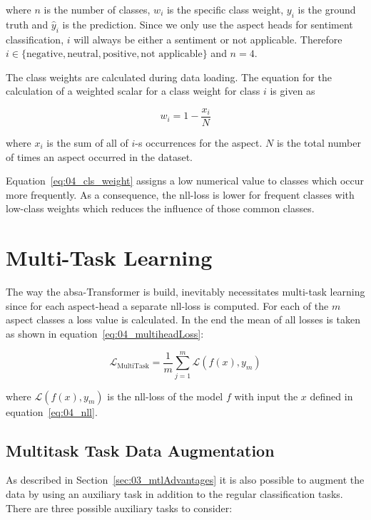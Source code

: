 where $n$ is the number of classes, $w_i$ is the specific class weight, $y_i$ is the ground truth and $\hat{y}_i$ is the prediction. Since we only use the aspect heads for sentiment classification, $i$ will always be either a sentiment or not applicable. Therefore $i \in \{\text{negative}, \text{neutral}, \text{positive}, \text{not applicable\}}$ and $n=4$.
\medskip

The class weights are calculated during data loading. The equation for the calculation of a weighted scalar for a class weight for class $i$ is given as

\begin{equation}
    w_i = 1 - \frac{x_i}{N}
\label{eq:04_cls_weight}
\end{equation}

where $x_i$ is the sum of all of $i$-s occurrences for the aspect. $N$ is the total number of times an aspect occurred in the dataset.
\medskip

Equation~\ref{eq:04_cls_weight} assigns a low numerical value to classes which occur more frequently. As a consequence, the \gls{nll}-loss is lower for frequent classes with low-class weights which reduces the influence of those common classes.  

\section{Multi-Task Learning}
\label{sec:04_multitask}
The way the \gls{absa}-Transformer is build, inevitably necessitates multi-task learning since for each aspect-head a separate \gls{nll}-loss is computed. For each of the $m$ aspect classes a loss value is calculated. In the end the mean of all losses is taken as shown in equation~\ref{eq:04_multiheadLoss}:

\begin{equation}
\mathcal{L}_\text{MultiTask} = \frac{1}{m}\sum_{j=1}^{m}\mathcal{L}(f(x), y_m)
\label{eq:04_multiheadLoss}
\end{equation}

where $\mathcal{L}(f(x), y_m)$ is the \gls{nll}-loss of the model $f$ with input the $x$ defined in equation~\ref{eq:04_nll}.

\subsection{Multitask Task Data Augmentation}

As described in Section~\ref{sec:03_mtlAdvantages} it is also possible to augment the data by using an auxiliary task in addition to the regular classification tasks.
There are three possible auxiliary tasks to consider:


